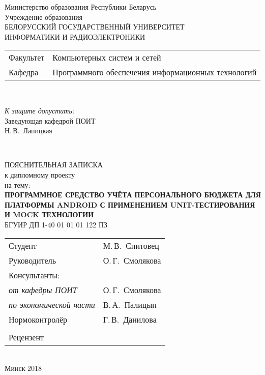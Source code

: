 \begin{titlepage}
  \begin{center}
    Министерство образования Республики Беларусь\\[1em]
    Учреждение образования\\
    БЕЛОРУССКИЙ ГОСУДАРСТВЕННЫЙ УНИВЕРСИТЕТ \\
    ИНФОРМАТИКИ И РАДИОЭЛЕКТРОНИКИ\\[1em]

    \begin{minipage}{\textwidth}
      \begin{flushleft}
        \begin{tabular}{ l l }
          Факультет & Компьютерных систем и сетей\\
          Кафедра   & Программного обеспечения информационных технологий
        \end{tabular}
      \end{flushleft}
    \end{minipage}\\[3em]

    \begin{flushright}
      \begin{minipage}{0.4\textwidth}
        \textit{К защите допустить:}\\[0.8em]
        Заведующая кафедрой ПОИТ\\[0.45em]
        \underline{\hspace*{2.8cm}} Н.\,В.~Лапицкая
      \end{minipage}\\[2.2em]
    \end{flushright}

    {ПОЯСНИТЕЛЬНАЯ ЗАПИСКА}\\
    {к дипломному проекту}\\
    {на тему:}\\[1em]
    \textbf{\MakeUppercase{Программное средство учёта персонального бюджета для платформы Android с применением Unit-тестирования и Mock технологии}}\\[1em]


    {БГУИР ДП 1-40 01 01 01 122 ПЗ}\\[2em]
    
    \begin{tabular}{ p{}p{} }
      Студент & М.\,В.~Снитовец \\
      Руководитель & О.\,Г.~Смолякова \\
      Консультанты: &\\
      \hspace*{3ex}\emph{от кафедры ПОИТ} & О.\,Г.~Смолякова \\
      \hspace*{3ex}\emph{по экономической части} & В.\,А.~Палицын \\
      Нормоконтролёр & Г.\,В.~Данилова \\
      & \\
      Рецензент &
    \end{tabular}
    \\[3cm]
    {\normalsize Минск 2018}
  \end{center}
\end{titlepage}
